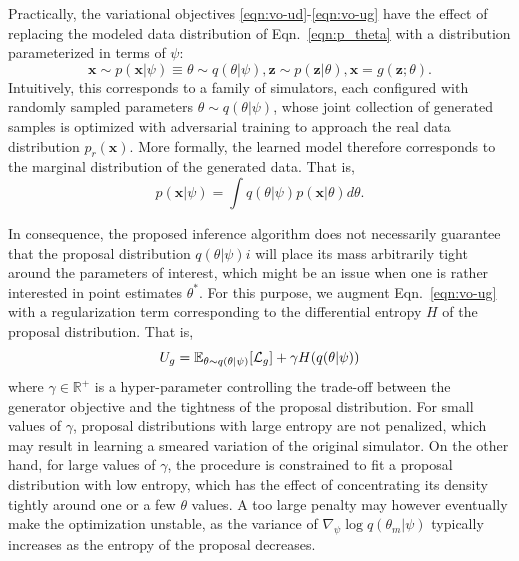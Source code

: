 \documentclass[twocolumn,superscriptaddress,aps]{revtex4-1}
\theoremstyle{plain}
\begin{document}
Practically, the variational objectives \ref{eqn:vo-ud}-\ref{eqn:vo-ug}
have the effect of replacing the modeled data distribution of Eqn.~\ref{eqn:p_theta} with
a distribution parameterized in terms of $\psi$:
\begin{equation}\label{eqn:p_psi}
    \mathbf{x} \sim p(\mathbf{x}|\psi) \equiv \theta \sim q(\theta|\psi), \mathbf{z} \sim p(\mathbf{z}|\theta), \mathbf{x} = g(\mathbf{z}; \theta).
\end{equation}
Intuitively, this corresponds to a family of simulators, each configured
with randomly sampled parameters $\theta \sim q(\theta|\psi)$, whose joint collection
of generated samples is optimized with adversarial training to approach the real data distribution $p_r(\mathbf{x})$.
More formally, the learned model  therefore corresponds to the marginal distribution
of the generated data. That is,
\begin{equation}
    p(\mathbf{x}|\psi) = \int q(\theta|\psi) p(\mathbf{x}|\theta) d\theta.
\end{equation}

In consequence, the proposed inference algorithm does not necessarily guarantee that the
proposal distribution $q(\theta|\psi)i$ will place its mass arbitrarily tight
around the parameters of interest, which might be an issue when one is rather interested in point estimates $\theta^*$.
For this purpose, we augment Eqn.~\ref{eqn:vo-ug}
with a regularization term corresponding to the differential entropy $H$ of
the proposal distribution. That is,
\begin{equation}
    U_g = \mathbb{E}_{\theta \sim q(\theta|\psi)} [ {\cal L}_g ] + \gamma H(q(\theta|\psi))
\end{equation}
where $\gamma \in \mathbb{R}^+$ is a hyper-parameter controlling the trade-off
between the generator objective and the tightness of the proposal distribution.
For small values of $\gamma$,
proposal distributions with large entropy are not penalized, which may result
in learning a smeared variation of the original simulator. On the other hand,
for large values of $\gamma$, the procedure is constrained to fit a proposal
distribution with low entropy, which has the effect of concentrating its density
tightly around one or a few $\theta$ values. A too large penalty may however
eventually make the optimization unstable, as the variance of $\nabla_\psi \log q(\theta_m|\psi)$
typically increases as the entropy of the proposal decreases.



\end{document}
